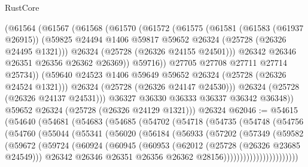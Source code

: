\begin{lexlean}{RustCore}
\begin{coremodule}
              (@61564
                (@61567
                  (@61568
                    (@61570
                      (@61572
                        (@61575
                          (@61581
                            (@61583 (@61937 @26915))
                            (@59825
                              @24494
                              @1406
                              @59817
                              @59652
                              @26324
                              (@25728 (@26326 @24495 @1321)))
                            @26324
                            (@25728 (@26326 @24155 @24501)))
                          @26342
                          @26346
                          @26351
                          @26356
                          @26362
                          @26369))
                      @59716))
                  @27705
                  @27708
                  @27711
                  @27714
                  @25734))
              (@59640 @24523 @1406 @59649 @59652 @26324 (@25728 (@26326 @24524 @1321)))
              @26324
              (@25728 (@26326 @24147 @24530)))
            @26324
            (@25728 (@26326 @24137 @24531)))
          @36327
          @36330
          @36333
          @36337
          @36342
          @36348))
      @59652
      @26324
      (@25728 (@26326 @24129 @1321)))
    @26324
@62046 := @54615
    (@54640
      (@54681
        (@54683
          (@54685
            (@54702
              (@54718
                (@54735
                  (@54748
                    (@54756
                      (@54760
                        (@55044
                          (@55341
                            (@56020
                              (@56184
                                (@56933
                                  (@57202
                                    (@57349
                                      (@59582
                                        (@59672
                                          (@59724
                                            (@60924
                                              (@60945
                                                (@60953
                                                  (@62012 (@25728 (@26326 @23685 @24549)))
                                                  @26342
                                                  @26346
                                                  @26351
                                                  @26356
                                                  @26362
                                                  @28156)))))))))))))))))))))))

\end{coremodule}
\end{lexlean}
